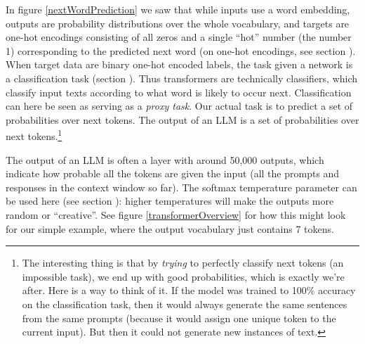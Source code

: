 In figure \ref{nextWordPrediction} we saw that while inputs use a word embedding, outputs are probability distributions over the whole vocabulary, and targets are one-hot encodings consisting of all zeros and a single ``hot'' number (the number 1) corresponding to the predicted next word (on one-hot encodings, see section ). When target data are binary one-hot encoded labels, the task given a network is a classification task (section ). Thus transformers are technically classifiers, which classify input texts according to what word is likely to occur next. Classification can here be seen as serving as a \emph{proxy task}. Our actual task is to predict a set of probabilities over next tokens. The output of an LLM is a set of probabilities over next tokens.\footnote{The interesting thing is that by \emph{trying} to perfectly classify next tokens (an impossible task), we end up with good probabilities, which is exactly we're after. Here is a way to think of it. If the model was trained to 100\% accuracy on the classification task, then it would always generate the same sentences from the same prompts (because it would assign one unique token to the current input). But then it could not generate new instances of text.}

The output of an LLM is often a  layer with around 50,000 outputs, which  indicate how probable all the tokens are given the input (all the prompts and responses in the context window so far). The softmax temperature parameter can be used here (see section ): higher temperatures will make the outputs more random or ``creative''. See figure \ref{transformerOverview} for how this might look for our simple example, where the output vocabulary just contains 7 tokens. 


